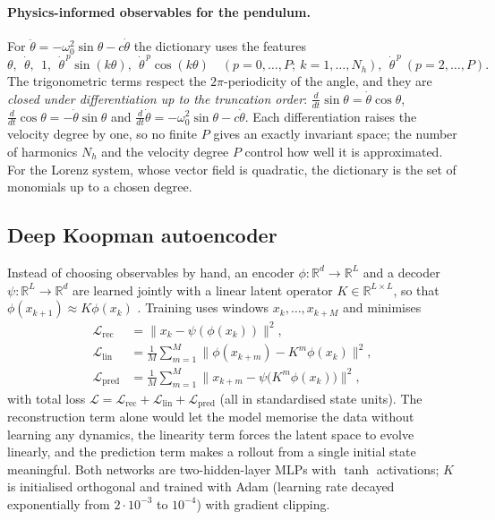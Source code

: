 \documentclass[11pt,a4paper]{article}
\newcommand{\R}{\mathbb{R}}
\begin{document}
\paragraph{Physics-informed observables for the pendulum.}
For $\ddot\theta=-\omega_0^2\sin\theta-c\dot\theta$ the dictionary uses the features
\begin{equation}
  \theta,\ \ \dot\theta,\ \ 1,\ \ \dot\theta^{\,p}\sin(k\theta),\ \ \dot\theta^{\,p}\cos(k\theta)
  \quad(p=0,\dots,P;\ k=1,\dots,N_h),\ \ \dot\theta^{\,p}\ (p=2,\dots,P).
\end{equation}
The trigonometric terms respect the $2\pi$-periodicity of the angle, and they are \emph{closed under
differentiation up to the truncation order}: $\tfrac{d}{dt}\sin\theta=\dot\theta\cos\theta$,
$\tfrac{d}{dt}\cos\theta=-\dot\theta\sin\theta$ and $\tfrac{d}{dt}\dot\theta=-\omega_0^2\sin\theta-c\dot\theta$.
Each differentiation raises the velocity degree by one, so no finite $P$ gives an exactly invariant space;
the number of harmonics $N_h$ and the velocity degree $P$ control how well it is approximated. For the Lorenz system, whose vector field is quadratic, the
dictionary is the set of monomials up to a chosen degree.

\subsection{Deep Koopman autoencoder}
Instead of choosing observables by hand, an encoder $\phi:\R^d\to\R^L$ and a decoder $\psi:\R^L\to\R^d$ are
learned jointly with a linear latent operator $K\in\R^{L\times L}$, so that $\phi(x_{k+1})\approx K\phi(x_k)$
\cite{Lusch2018}. Training uses windows $x_k,\dots,x_{k+M}$ and minimises
\begin{align}
  \mathcal L_{\mathrm{rec}} &= \bigl\|x_k-\psi(\phi(x_k))\bigr\|^2, \\
  \mathcal L_{\mathrm{lin}} &= \tfrac1M\sum_{m=1}^{M}\bigl\|\phi(x_{k+m})-K^{m}\phi(x_k)\bigr\|^2, \\
  \mathcal L_{\mathrm{pred}}&= \tfrac1M\sum_{m=1}^{M}\bigl\|x_{k+m}-\psi\bigl(K^{m}\phi(x_k)\bigr)\bigr\|^2,
\end{align}
with total loss $\mathcal L=\mathcal L_{\mathrm{rec}}+\mathcal L_{\mathrm{lin}}+\mathcal L_{\mathrm{pred}}$ (all in
standardised state units). The reconstruction term alone would let the model memorise the data without learning
any dynamics, the linearity term forces the latent space to evolve linearly, and the prediction term makes a rollout
from a single initial state meaningful. Both networks are two-hidden-layer MLPs with $\tanh$ activations; $K$ is
initialised orthogonal and trained with Adam (learning rate decayed exponentially from $2\cdot10^{-3}$ to
$10^{-4}$) with gradient clipping.
\end{document}

